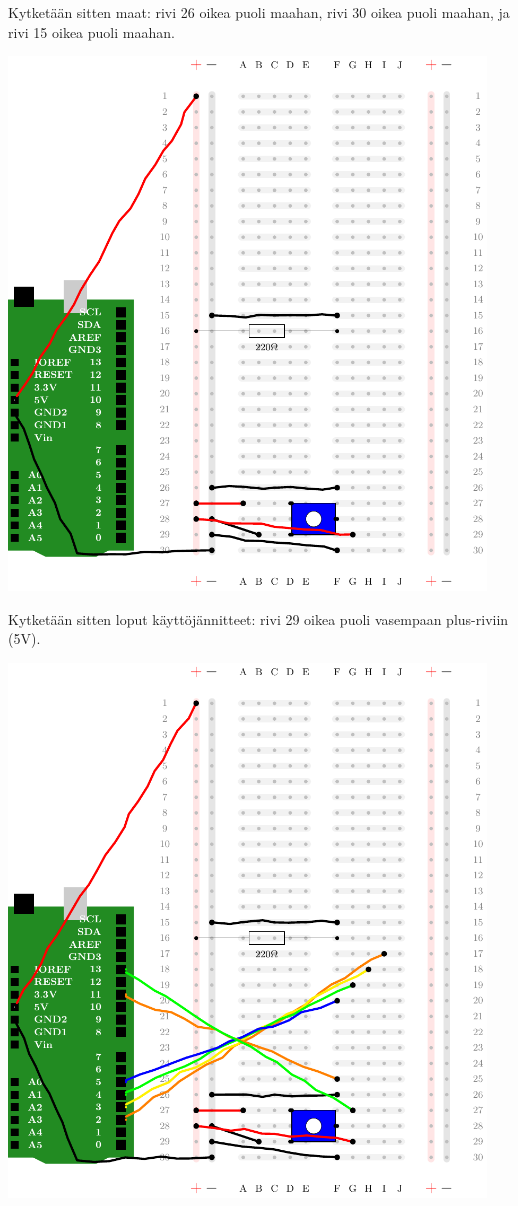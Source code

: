 Kytketään sitten maat: rivi 26 oikea puoli maahan, rivi 30 oikea puoli maahan, ja rivi 15 oikea puoli maahan.


\includegraphics[width=0.95\textwidth]{kuvat/kuva21.pdf}

Kytketään sitten loput käyttöjännitteet: rivi 29 oikea puoli vasempaan plus-riviin (5V). 


\includegraphics[width=0.95\textwidth]{kuvat/kuva22.pdf}

